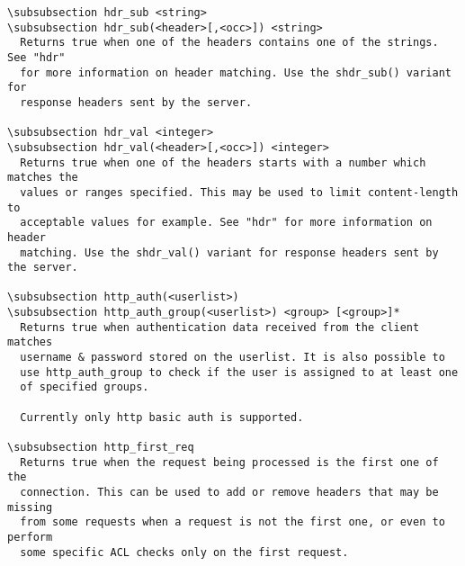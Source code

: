 \begin{verbatim}
\subsubsection hdr_sub <string>
\subsubsection hdr_sub(<header>[,<occ>]) <string>
  Returns true when one of the headers contains one of the strings. See "hdr"
  for more information on header matching. Use the shdr_sub() variant for
  response headers sent by the server.

\subsubsection hdr_val <integer>
\subsubsection hdr_val(<header>[,<occ>]) <integer>
  Returns true when one of the headers starts with a number which matches the
  values or ranges specified. This may be used to limit content-length to
  acceptable values for example. See "hdr" for more information on header
  matching. Use the shdr_val() variant for response headers sent by the server.

\subsubsection http_auth(<userlist>)
\subsubsection http_auth_group(<userlist>) <group> [<group>]*
  Returns true when authentication data received from the client matches
  username & password stored on the userlist. It is also possible to
  use http_auth_group to check if the user is assigned to at least one
  of specified groups.

  Currently only http basic auth is supported.

\subsubsection http_first_req
  Returns true when the request being processed is the first one of the
  connection. This can be used to add or remove headers that may be missing
  from some requests when a request is not the first one, or even to perform
  some specific ACL checks only on the first request.


\end{verbatim}
